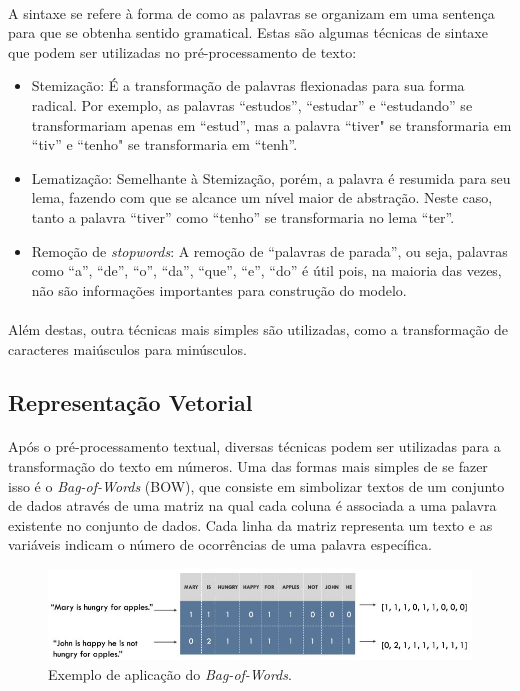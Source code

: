 \documentclass[grad,numbers]{coppe}
\begin{document}
	  	\paragraph{}A sintaxe se refere à forma de como as palavras se organizam em uma sentença para que se obtenha sentido gramatical. Estas são algumas técnicas de sintaxe que podem ser utilizadas no pré-processamento de texto:
	  	\begin{itemize}
	  		\item Stemização: É a transformação de palavras flexionadas para sua forma radical. Por exemplo, as palavras ``estudos'', ``estudar'' e ``estudando'' se transformariam apenas em ``estud'', mas a palavra ``tiver" se transformaria em ``tiv'' e ``tenho" se transformaria em ``tenh''.
	  		\item Lematização: Semelhante à Stemização, porém, a palavra é resumida para seu lema, fazendo com que se alcance um nível maior de abstração. Neste caso, tanto a palavra ``tiver'' como ``tenho'' se transformaria no lema  ``ter''.
	  		\item Remoção de \textit{stopwords}: A remoção de ``palavras de parada'', ou seja, palavras como ``a'', ``de'', ``o'', ``da'', ``que'', ``e'', ``do'' é útil pois, na maioria das vezes, não são informações importantes para construção do modelo.
	  	\end{itemize}
  	\paragraph{}Além destas, outra técnicas mais simples são utilizadas, como a transformação de caracteres maiúsculos para minúsculos.
  	\subsection{Representação Vetorial}
  		\paragraph{}Após o pré-processamento textual, diversas técnicas podem ser utilizadas para a transformação do texto em números. Uma das formas mais simples de se fazer isso é o \textit{Bag-of-Words} (BOW), que consiste em simbolizar textos de um conjunto de dados através de uma matriz na qual cada coluna é associada a uma palavra existente no conjunto de dados. Cada linha da matriz representa um texto e as variáveis indicam o número de ocorrências de uma palavra específica.
  		\begin{figure}[h]
  			\includegraphics[width=15cm]{bow-example.jpg}
  			\caption{Exemplo de aplicação do \textit{Bag-of-Words}\cite{bow-example}.}
  			\label{fig:bow-example-fig}
  		\end{figure}
\end{document}
